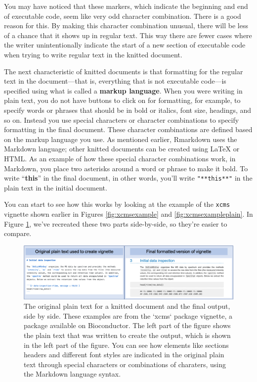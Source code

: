 \documentclass[]{tufte-book}
\begin{document}
You may have noticed that these markers, which indicate the beginning and end of
executable code, seem like very odd character combination. There is a good
reason for this. By making this character combination unusual, there will be
less of a chance that it shows up in regular text. This way there are fewer
cases where the writer unintentionally indicate the start of a new section of
executable code when trying to write regular text in the knitted document.

The next characteristic of knitted documents is that formatting for the regular
text in the document---that is, everything that is not executable code---is
specified using what is called a \textbf{markup language}. When you were writing in
plain text, you do not have buttons to click on for formatting, for example, to
specify words or phrases that should be in bold or italics, font size, headings,
and so on. Instead you use special characters or character combinations to
specify formatting in the final document. These character combinations are
defined based on the markup language you use. As mentioned earlier, Rmarkdown
uses the Markdown language; other knitted documents can be created using LaTeX
or HTML. As an example of how these special character combinations work, in
Markdown, you place two asterisks around a word or phrase to make it bold. To
write ``\textbf{this}'' in the final document, in other words, you'll write
\texttt{"**this**"} in the plain text in the initial document.

You can start to see how this works by looking at the example of the \texttt{xcms}
vignette shown earlier in Figures \ref{fig:xcmsexample} and
\ref{fig:xcmsexampleplain}. In Figure \ref{fig:xcmsbothversions}, we've
recreated these two parts side-by-side, so they're easier to compare.

\begin{figure}
\includegraphics[width=\textwidth]{figures/originalandfinal} \caption[The original plain text for a knitted document and the final output, side by side]{The original plain text for a knitted document and the final output, side by side. These examples are from the `xcms` package vignette, a package available on Bioconductor. The left part of the figure shows the plain text that was written to create the output, which is shown in the left part of the figure. You can see how elements like sections headers and different font styles are indicated in the original plain text through special characters or combinations of charaters, using the Markdown language syntax.}\label{fig:xcmsbothversions}
\end{figure}
\end{document}
